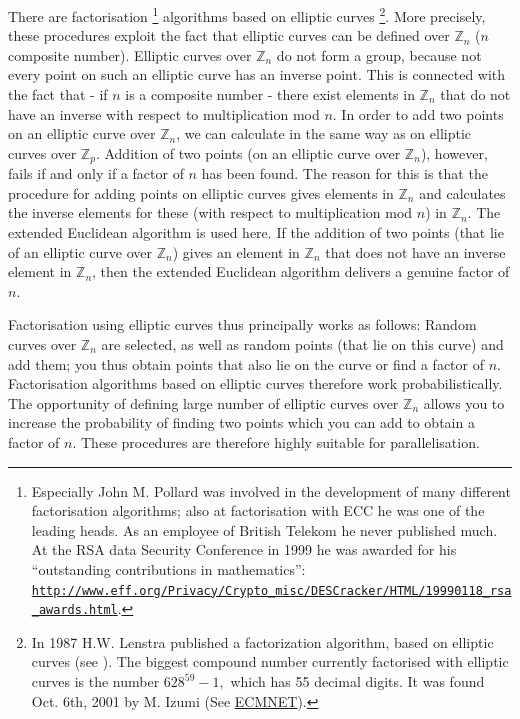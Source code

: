 There are factorisation%
\footnote{Especially John M. Pollard  was involved
in the development of many different factorisation algorithms; also at
factorisation with ECC he was one of the leading heads. As an employee
of British Telekom he never published much. At the RSA data Security Conference
in 1999 he was awarded for his ``outstanding contributions in mathematics'':
\href{http://www.eff.org/Privacy/Crypto_misc/DESCracker/HTML/19990118_rsa_awards.html}
{\texttt{http://www.eff.org/Privacy/Crypto\_misc/DESCracker/HTML/19990118\_rsa\_awards.html}}.
}
algorithms based on elliptic curves%
\footnote{In 1987 H.W. Lenstra published
a factorization algorithm, based on elliptic curves (see \cite{Lenstra1987}).
The biggest compound number currently 
factorised with elliptic curves is 
the number $ 628^{59}-1, $ which has 55 decimal digits. It was
found Oct. 6th, 2001 by M. Izumi 
(See \hyperlink{Lenstra2}{ECMNET}).
}. 
More precisely, these procedures exploit the fact that elliptic curves can
be defined over ${\mathbb Z}_n$ ($n$ composite number). Elliptic curves 
over ${\mathbb Z}_n$ do not form a group, because not every point on such 
an elliptic curve has an inverse point. This is connected with the fact 
that - if $n$ is a composite
number - there exist elements in ${\mathbb Z}_n$ that do not have an inverse
with respect to multiplication mod $n$. In order to add two points on an
elliptic curve over ${\mathbb Z}_n$, we can calculate in the same way as on
elliptic curves over ${\mathbb Z}_p$. Addition of two points (on an elliptic
curve over ${\mathbb Z}_n$), however, fails if and only if a factor of $n$ has
been found. The reason for this is that the procedure for adding points on
elliptic curves gives elements in ${\mathbb Z}_n$ and calculates the inverse
elements for these (with respect to multiplication mod $n$) in ${\mathbb Z}_n$.
The extended  Euclidean algorithm is used here. If
the addition of two points (that lie of an elliptic curve over ${\mathbb Z}_n$)
gives an element in ${\mathbb Z}_n$ that does not have an inverse element in
${\mathbb Z}_n$, then the extended Euclidean algorithm delivers a genuine factor
of $n$.

Factorisation using elliptic curves thus principally works as follows: 
Random curves over ${\mathbb Z}_n$ are selected, as well as random points
(that lie on this curve) and add them; you thus obtain points that also
lie on the curve or find a factor of $n$. 
Factorisation algorithms based on elliptic curves
therefore work probabilistically. The opportunity of defining large number of
elliptic curves over ${\mathbb Z}_n$ allows you to increase the probability of
finding two points which you can add to obtain a factor of $n$. These procedures
are therefore highly suitable for parallelisation.


